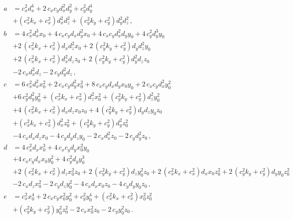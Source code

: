 \documentclass[12pt,a4paper,twoside,openright,BCOR10mm,headsepline,titlepage,abstracton,chapterprefix,final]{scrreprt}
\begin{document}
\begin{subequations}
 \begin{align}
  a &= c_{x}^{2} d_{x}^{4} + 2 \, c_{x} c_{y} d_{x}^{2} d_{y}^{2} + c_{y}^{2} d_{y}^{4} \nonumber\\&
       + {\left(c_{x}^{2} k_{x} + c_{x}^{2}\right)} d_{x}^{2} d_{z}^{2} + {\left(c_{y}^{2} k_{y} + c_{y}^{2}\right)} d_{y}^{2} d_{z}^{2}\,,\\
  b &= 4 \, c_{x}^{2} d_{x}^{3} x_{0} + 4 \, c_{x} c_{y} d_{x} d_{y}^{2} x_{0} + 4 \, c_{x} c_{y} d_{x}^{2} d_{y} y_{0} + 4 \, c_{y}^{2} d_{y}^{3} y_{0}\nonumber\\&
       + 2 \, {\left(c_{x}^{2} k_{x} + c_{x}^{2}\right)} d_{x} d_{z}^{2} x_{0} + 2 \, {\left(c_{y}^{2} k_{y} + c_{y}^{2}\right)} d_{y} d_{z}^{2} y_{0}\nonumber\\&
       + 2 \, {\left(c_{x}^{2} k_{x} + c_{x}^{2}\right)} d_{x}^{2} d_{z} z_{0} + 2 \, {\left(c_{y}^{2} k_{y} + c_{y}^{2}\right)} d_{y}^{2} d_{z} z_{0}\nonumber\\&
       - 2 \, c_{x} d_{x}^{2} d_{z} - 2 \, c_{y} d_{y}^{2} d_{z}\,,\\
  c &= 6 \, c_{x}^{2} d_{x}^{2} x_{0}^{2} + 2 \, c_{x} c_{y} d_{y}^{2} x_{0}^{2} + 8 \, c_{x} c_{y} d_{x} d_{y} x_{0} y_{0} + 2 \, c_{x} c_{y} d_{x}^{2} y_{0}^{2}\nonumber\\&
     + 6 \, c_{y}^{2} d_{y}^{2} y_{0}^{2} + {\left(c_{x}^{2} k_{x} + c_{x}^{2}\right)} d_{z}^{2} x_{0}^{2} + {\left(c_{y}^{2} k_{y} + c_{y}^{2}\right)} d_{z}^{2} y_{0}^{2}\nonumber\\&
     + 4 \, {\left(c_{x}^{2} k_{x} + c_{x}^{2}\right)} d_{x} d_{z} x_{0} z_{0} + 4 \, {\left(c_{y}^{2} k_{y} + c_{y}^{2}\right)} d_{y} d_{z} y_{0} z_{0}\nonumber\\&
     + {\left(c_{x}^{2} k_{x} + c_{x}^{2}\right)} d_{x}^{2} z_{0}^{2} + {\left(c_{y}^{2} k_{y} + c_{y}^{2}\right)} d_{y}^{2} z_{0}^{2}\nonumber\\&
     - 4 \, c_{x} d_{x} d_{z} x_{0} - 4 \, c_{y} d_{y} d_{z} y_{0} - 2 \, c_{x} d_{x}^{2} z_{0} - 2 \, c_{y} d_{y}^{2} z_{0}\,,\\
  d &= 4 \, c_{x}^{2} d_{x} x_{0}^{3} + 4 \, c_{x} c_{y} d_{y} x_{0}^{2} y_{0}\nonumber\\&
     + 4 \, c_{x} c_{y} d_{x} x_{0} y_{0}^{2} + 4 \, c_{y}^{2} d_{y} y_{0}^{3}\nonumber\\&
     + 2 \, {\left(c_{x}^{2} k_{x} + c_{x}^{2}\right)} d_{z} x_{0}^{2} z_{0} + 2 \, {\left(c_{y}^{2} k_{y} + c_{y}^{2}\right)} d_{z} y_{0}^{2} z_{0} 
     + 2 \, {\left(c_{x}^{2} k_{x} + c_{x}^{2}\right)} d_{x} x_{0} z_{0}^{2} + 2 \, {\left(c_{y}^{2} k_{y} + c_{y}^{2}\right)} d_{y} y_{0} z_{0}^{2}\nonumber\\&
     - 2 \, c_{x} d_{z} x_{0}^{2} - 2 \, c_{y} d_{z} y_{0}^{2} - 4 \, c_{x} d_{x} x_{0} z_{0} - 4 \, c_{y} d_{y} y_{0} z_{0}\,,\\
  e &= c_{x}^{2} x_{0}^{4} + 2 \, c_{x} c_{y} x_{0}^{2} y_{0}^{2} + c_{y}^{2} y_{0}^{4} + {\left(c_{x}^{2} k_{x} + c_{x}^{2}\right)} x_{0}^{2} z_{0}^{2}\nonumber\\&
    + {\left(c_{y}^{2} k_{y} + c_{y}^{2}\right)} y_{0}^{2} z_{0}^{2} - 2 \, c_{x} x_{0}^{2} z_{0} - 2 \, c_{y} y_{0}^{2} z_{0}\,.
 \end{align}
\end{subequations}
\end{document}
